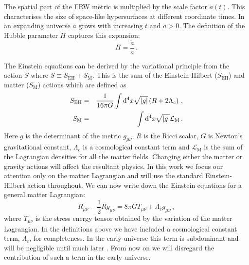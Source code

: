 The spatial part of the FRW metric is multiplied by the scale factor $a(t)$.
This characterises the size of space-like hypersurfaces at
different coordinate times. In an expanding universe $a$ grows with
increasing $t$ and
$\dot{a}>0$.
The definition of the Hubble parameter $H$ captures this expansion:
\begin{equation}
 \label{eq:Hdefn-intro}
  H = \frac{\dot{a}}{a} \,.
\end{equation}
%


The Einstein equations can be derived by the variational principle from the
action $S$ where $S\equiv S_\mathrm{EH} + S_\mathrm{M}$. This is the sum
of the
Einstein-Hilbert ($S_\mathrm{EH}$) and matter ($S_\mathrm{M}$) actions which are
defined as 
% 
\begin{eqnarray}
\label{eq:EHeqn-intro}
 S_\mathrm{EH} &=& \frac{1}{16\pi G}\int \mathrm{d}^4 x \sqrt{|g|} \left(R +
2\Lambda_c\right) \,,\\
\label{eq:matteraction-intro}
 S_\mathrm{M} &=& \int \mathrm{d}^4 x \sqrt{|g|}
\mathcal{L}_\mathrm{M} \,.
\end{eqnarray}
%
Here $g$ is the determinant of the metric $g_{\mu\nu}$, $R$ is the Ricci
scalar, $G$ is Newton's gravitational constant, $\Lambda_c$ is a cosmological
constant term 
and $\mathcal{L}_\mathrm{M}$ is the sum of the Lagrangian densities
for all the matter fields.
Changing either the matter or gravity actions will affect the
resultant physics. In this work we focus our attention only on the matter
Lagrangian and will use the standard Einstein-Hilbert action throughout.
We can now write down the Einstein equations for a general matter Lagrangian:
% 
\begin{equation}
\label{eq:einstein-intro}
 R_{\mu\nu} - \frac{1}{2}R g_{\mu\nu} = 8\pi G T_{\mu\nu} + \Lambda_c
g_{\mu\nu}\,,
\end{equation}
% 
where $T_{\mu\nu}$ is the stress energy tensor obtained by the variation of the
matter Lagrangian. 
In the definitions above we have included a
cosmological constant term, $\Lambda_c$, for completeness. In the early
universe this term is subdominant and will be negligible until much later
\cite{book:liddle}. From now on we will
disregard the contribution of such a term in the early universe.


